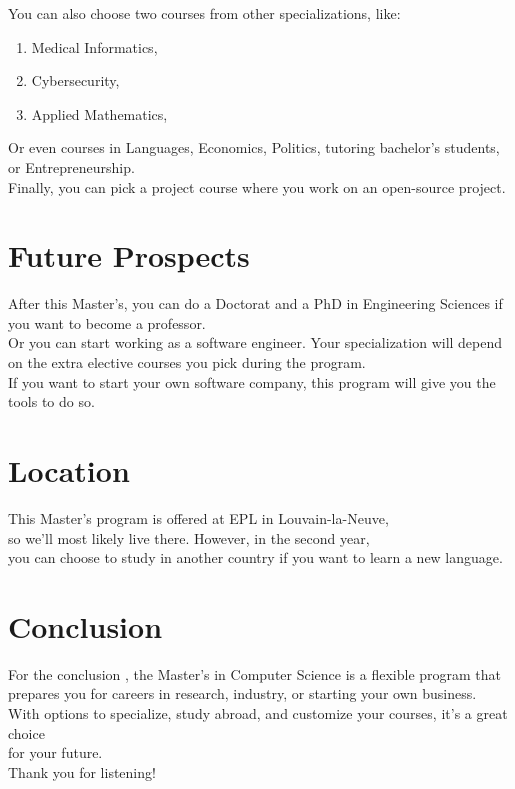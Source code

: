 \documentclass{article}
\begin{document}
You can also choose two courses from other specializations, like: \\
\begin{enumerate} 
 \item Medical Informatics,  
  \item Cybersecurity,  
  \item Applied Mathematics, 
\end{enumerate}
Or even courses in Languages, Economics, Politics, tutoring bachelor’s students, 
or Entrepreneurship.  \\

Finally, you can pick a project course where you work on an open-source project.

\section{Future Prospects}

After this Master’s, you can do a Doctorat and a PhD in Engineering Sciences 
if you want to become a professor.  \\

Or you can start working as a software engineer. Your specialization will 
depend on the extra elective courses you pick during the program. \\ 

If you want to start your own software company, this program will give you the tools to do so.\\

\section{Location}

This Master’s program is offered at EPL in Louvain-la-Neuve, \\
so we’ll most likely live there. However, in the second year, \\
you can choose to study in another country if you want to learn a new language.

\section{Conclusion}

For the conclusion , the Master’s in Computer Science is a flexible program that \\
prepares you for careers in research, industry, or starting your own business. \\
With options to specialize, study abroad, and customize your courses, it’s a great choice \\
for your future.  \\

Thank you for listening!
\end{document}
